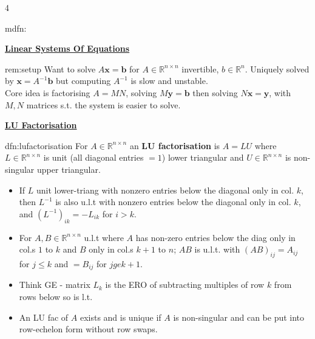 \documentclass[landscape, 8pt]{extarticle}
\begin{document}
\begin{multicols*}{4}
\begin{mdfn}[Norms]{mdfn:}{ }
		\end{mdfn}
		
		
	
{\footnotesize \textbf{\underline{Linear Systems Of Equations}}}
		
		\begin{rem}[Setup]{rem:setup}{ }
			Want to solve $A\mathbf{x} = \mathbf{b}$ for $A\in \mathbb{R}^{n \times n}$ invertible, $b\in \mathbb{R}^n$. Uniquely solved by $\mathbf{x} = A^{-1}\mathbf{b}$ but computing $A^{-1}$ is slow and unstable.\\
			Core idea is factorising $A=MN$, solving $M\mathbf{y} = \mathbf{b}$ then solving $N\mathbf{x} = \mathbf{y}$, with $M, N$ matrices s.t. the system is easier to solve.
			
		\end{rem}
		
		
	{\tiny\textbf{\underline{LU Factorisation}}}
		
		
		\begin{dfn}[LU Factorisation]{dfn:lufactorisation}{ }
			For $A\in \mathbb{R}^{n \times n}$ an \textbf{LU factorisation} is $A = LU$ where $L\in \mathbb{R}^{n \times n}$ is unit (all diagonal entries $=1$) lower triangular and $U\in \mathbb{R}^{n \times n}$ is non-singular upper triangular.
			
			\begin{itemize}
				\item If $L$ unit lower-triang with nonzero entries below the diagonal only in col. $k$, then $L^{-1}$ is also u.l.t with nonzero entries below the diagonal only in col. $k$, and $(L^{-1})_{ik} = -L_{ik}$ for $i > k$.
				\item For $A, B\in \mathbb{R}^{n \times n}$ u.l.t where $A$ has non-zero entries below the diag only in col.s $1$ to $k$ and $B$ only in col.s $k+1$ to $n$; $AB$ is u.l.t. with $(AB)_{ij} = A_{ij}$ for $j \le k$ and $=B_{ij}$ for $j ge k +1$.
				\item Think GE - matrix $L_k$ is the ERO of subtracting multiples of row $k$ from rows below so is l.t.
				\item An LU fac of $A$ exists and is unique if $A$ is non-singular and can be put into row-echelon form without row swaps.
			\end{itemize}
			

\end{dfn}
\end{multicols*}
\end{document}
